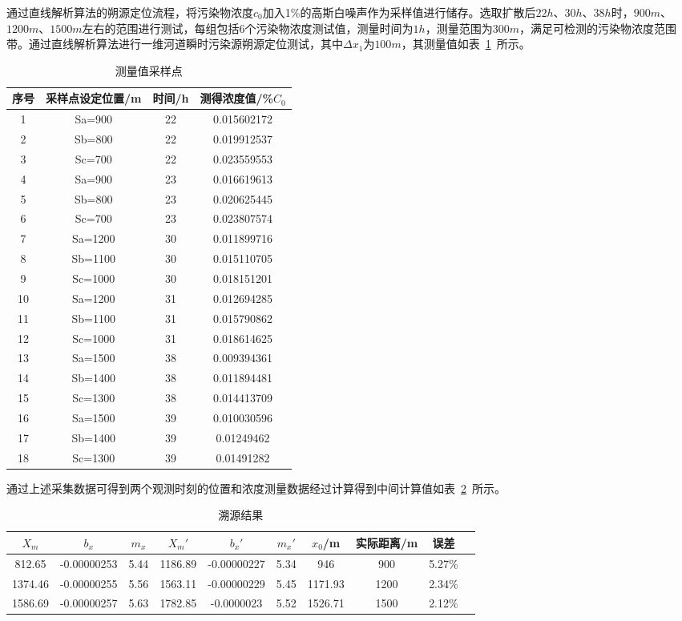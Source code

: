 \documentclass{whutmod}
\begin{document}
通过直线解析算法的朔源定位流程，将污染物浓度$c_{0}$加入1\%的高斯白噪声作为采样值进行储存。选取扩散后$22h$、$30h$、$38h$时，$900m$、$1200m$、$1500m$左右的范围进行测试，每组包括6个污染物浓度测试值，测量时间为$1h$，测量范围为$300m$，满足可检测的污染物浓度范围带。通过直线解析算法进行一维河道瞬时污染源朔源定位测试，其中$\Delta x_{1}$为$100m$，其测量值如表~\ref{biao}~所示。
	\begin{table}[H]
	\caption{测量值采样点}\label{biao} \centering
	\begin{tabular}{cccc}
		\toprule[1.5pt]
		序号 &采样点设定位置/m&  时间/h & 测得浓度值/\%$C_{0}$ \\
		\midrule[1pt]
		1	& Sa=900 &22 &0.015602172\\
		2	& Sb=800 & 22 &0.019912537\\
		3	& Sc=700 &22 &0.023559553\\
		4	& Sa=900 &23 &0.016619613\\
		5	& Sb=800 &23 &0.020625445\\
		6	& Sc=700 &23&0.023807574\\
		7	& Sa=1200 &30 &0.011899716\\
		8	& Sb=1100 &30 &0.015110705\\
		9	& Sc=1000 &30 &0.018151201\\
		10	& Sa=1200 &31 &0.012694285\\
		11	& Sb=1100 &31 &0.015790862\\
		12	& Sc=1000 &31 &0.018614625\\
		13	& Sa=1500 &38 &0.009394361\\
		14	& Sb=1400 &38 &0.011894481\\
		15	& Sc=1300 &38 &0.014413709\\
		16	& Sa=1500 &39 &0.010030596\\
		17	& Sb=1400 &39 &0.01249462\\
		18	& Sc=1300 &39 &0.01491282\\
		\bottomrule[1.5pt]
	\end{tabular}
\end{table}

通过上述采集数据可得到两个观测时刻的位置和浓度测量数据经过计算得到中间计算值如表~\ref{biao2}~所示。
	\begin{table}[H]
	\caption{溯源结果}\label{biao2} \centering
	\begin{tabular}{cccccccccc}
		\toprule[1.5pt]
		$X_{m}$& $b_{x}$ & $m_{x}$ &${X_{m}}'$ & ${b_{x}}'$&${m_{x}}'$&$x_{0}$/m&实际距离/m& 误差\\
		\midrule[1pt]
		812.65 &-0.00000253 &5.44&1186.89&-0.00000227&5.34&946&900&5.27\%\\
		1374.46& -0.00000255 &5.56&1563.11&-0.00000229&5.45&1171.93&1200&2.34\%\\
		1586.69 &-0.00000257 &5.63&1782.85&-0.0000023&5.52&1526.71&1500&2.12\%\\
		\bottomrule[1.5pt]
	\end{tabular}
\end{table}
\end{document}
